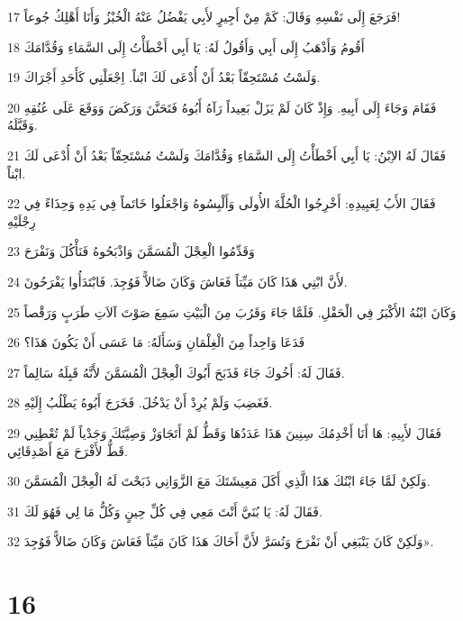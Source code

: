 \par 17 فَرَجَعَ إِلَى نَفْسِهِ وَقَالَ: كَمْ مِنْ أَجِيرٍ لأَبِي يَفْضُلُ عَنْهُ الْخُبْزُ وَأَنَا أَهْلِكُ جُوعاً!
\par 18 أَقُومُ وَأَذْهَبُ إِلَى أَبِي وَأَقُولُ لَهُ: يَا أَبِي أَخْطَأْتُ إِلَى السَّمَاءِ وَقُدَّامَكَ
\par 19 وَلَسْتُ مُسْتَحِقّاً بَعْدُ أَنْ أُدْعَى لَكَ ابْناً. اِجْعَلْنِي كَأَحَدِ أَجْرَاكَ.
\par 20 فَقَامَ وَجَاءَ إِلَى أَبِيهِ. وَإِذْ كَانَ لَمْ يَزَلْ بَعِيداً رَآهُ أَبُوهُ فَتَحَنَّنَ وَرَكَضَ وَوَقَعَ عَلَى عُنُقِهِ وَقَبَّلَهُ.
\par 21 فَقَالَ لَهُ الاِبْنُ: يَا أَبِي أَخْطَأْتُ إِلَى السَّمَاءِ وَقُدَّامَكَ وَلَسْتُ مُسْتَحِقّاً بَعْدُ أَنْ أُدْعَى لَكَ ابْناً.
\par 22 فَقَالَ الأَبُ لِعَبِيدِهِ: أَخْرِجُوا الْحُلَّةَ الأُولَى وَأَلْبِسُوهُ وَاجْعَلُوا خَاتَماً فِي يَدِهِ وَحِذَاءً فِي رِجْلَيْهِ
\par 23 وَقَدِّمُوا الْعِجْلَ الْمُسَمَّنَ وَاذْبَحُوهُ فَنَأْكُلَ وَنَفْرَحَ
\par 24 لأَنَّ ابْنِي هَذَا كَانَ مَيِّتاً فَعَاشَ وَكَانَ ضَالاًّ فَوُجِدَ. فَابْتَدَأُوا يَفْرَحُونَ.
\par 25 وَكَانَ ابْنُهُ الأَكْبَرُ فِي الْحَقْلِ. فَلَمَّا جَاءَ وَقَرُبَ مِنَ الْبَيْتِ سَمِعَ صَوْتَ آلاَتِ طَرَبٍ وَرَقْصاً
\par 26 فَدَعَا وَاحِداً مِنَ الْغِلْمَانِ وَسَأَلَهُ: مَا عَسَى أَنْ يَكُونَ هَذَا؟
\par 27 فَقَالَ لَهُ: أَخُوكَ جَاءَ فَذَبَحَ أَبُوكَ الْعِجْلَ الْمُسَمَّنَ لأَنَّهُ قَبِلَهُ سَالِماً.
\par 28 فَغَضِبَ وَلَمْ يُرِدْ أَنْ يَدْخُلَ. فَخَرَجَ أَبُوهُ يَطْلُبُ إِلَيْهِ.
\par 29 فَقَالَ لأَبِيهِ: هَا أَنَا أَخْدِمُكَ سِنِينَ هَذَا عَدَدُهَا وَقَطُّ لَمْ أَتَجَاوَزْ وَصِيَّتَكَ وَجَدْياً لَمْ تُعْطِنِي قَطُّ لأَفْرَحَ مَعَ أَصْدِقَائِي.
\par 30 وَلَكِنْ لَمَّا جَاءَ ابْنُكَ هَذَا الَّذِي أَكَلَ مَعِيشَتَكَ مَعَ الزَّوَانِي ذَبَحْتَ لَهُ الْعِجْلَ الْمُسَمَّنَ.
\par 31 فَقَالَ لَهُ: يَا بُنَيَّ أَنْتَ مَعِي فِي كُلِّ حِينٍ وَكُلُّ مَا لِي فَهُوَ لَكَ.
\par 32 وَلَكِنْ كَانَ يَنْبَغِي أَنْ نَفْرَحَ وَنُسَرَّ لأَنَّ أَخَاكَ هَذَا كَانَ مَيِّتاً فَعَاشَ وَكَانَ ضَالاًّ فَوُجِدَ».

\chapter{16}

